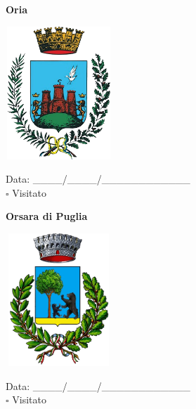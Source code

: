 \documentclass[a5paper,12pt]{article}
\begin{document}
\vspace{0.7cm}

\noindent
\begin{minipage}[t]{0.45\textwidth}
    \begin{center}
        \textbf{Oria}
    \end{center}
    \vspace{-0.5cm} %
    \begin{center}
        \includegraphics[height= 5cm, width=4cm]{Puglia/Stemma Oria.png}
    \end{center}
    \vspace{-0.4cm} %
    \begin{flushleft}
        Data: \_\_\_\_/\_\_\_\_/\_\_\_\_\_\_\_\_\_\_\_\_ \\
        $\square$ Visitato
    \end{flushleft}
\end{minipage}
\hfill
\noindent
\begin{minipage}[t]{0.45\textwidth}
    \begin{center}
        \textbf{Orsara di Puglia}
    \end{center}
    \vspace{-0.5cm} %
    \begin{center}
        \includegraphics[height= 5cm, width=4cm]{Puglia/Stemma Orsara di Puglia.png}
    \end{center}
    \vspace{-0.4cm} %
    \begin{flushleft}
        Data: \_\_\_\_/\_\_\_\_/\_\_\_\_\_\_\_\_\_\_\_\_ \\
        $\square$ Visitato
    \end{flushleft}
\end{minipage}
\end{document}
